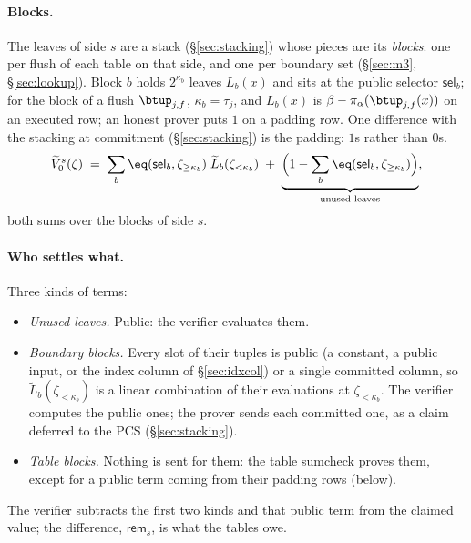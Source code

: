 \paragraph{Blocks.} The leaves of side $s$ are a stack (\S\ref{sec:stacking}) whose pieces are its \emph{blocks}: one per flush of each table on that side, and one per boundary set (\S\ref{sec:m3}, \S\ref{sec:lookup}). Block $b$ holds $2^{\kappa_b}$ leaves $L_b(x)$ and sits at the public selector $\mathsf{sel}_b$; for the block of a flush $\btup_{j,f}$, $\kappa_b=\tau_j$, and $L_b(x)$ is $\beta-\pi_\alpha(\btup_{j,f}(x))$ on an executed row; an honest prover puts $1$ on a padding row. One difference with the stacking at commitment (\S\ref{sec:stacking}) is the padding: $1$s rather than $0$s.
\begin{equation}\label{eq:gkr_leaves}
  \widetilde V^{s}_0(\zeta)\;=\;\sum_{b}\eq(\mathsf{sel}_b,\zeta_{\ge\kappa_b})\;\widetilde L_b(\zeta_{<\kappa_b})\;+\;\underbrace{\Bigl(1-\sum_{b}\eq(\mathsf{sel}_b,\zeta_{\ge\kappa_b})\Bigr)}_{\text{unused leaves}},
\end{equation}
both sums over the blocks of side $s$.

\paragraph{Who settles what.} Three kinds of terms:
\begin{itemize}[itemsep=1pt,topsep=3pt]
\item \emph{Unused leaves.} Public: the verifier evaluates them.
\item \emph{Boundary blocks.} Every slot of their tuples is public (a constant, a public input, or the index column of \S\ref{sec:idxcol}) or a single committed column, so $\widetilde L_b(\zeta_{<\kappa_b})$ is a linear combination of their evaluations at $\zeta_{<\kappa_b}$. The verifier computes the public ones; the prover sends each committed one, as a claim deferred to the PCS (\S\ref{sec:stacking}).
\item \emph{Table blocks.} Nothing is sent for them: the table sumcheck proves them, except for a public term coming from their padding rows (below).
\end{itemize}
The verifier subtracts the first two kinds and that public term from the claimed value; the difference, $\mathsf{rem}_{s}$, is what the tables owe.

